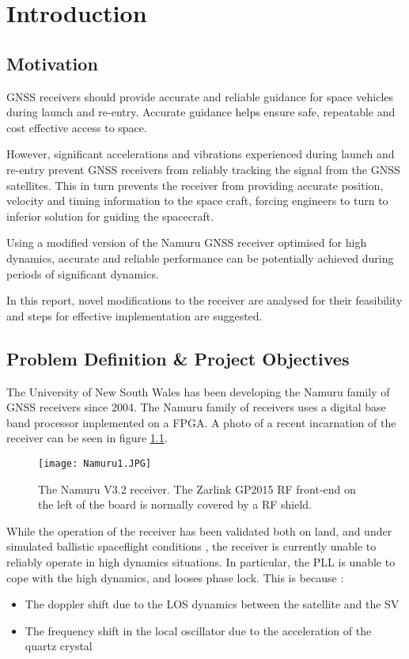 \chapter{Introduction}\label{ch:intro}

\section{Motivation}
\ac{GNSS} receivers should provide accurate and reliable guidance for space vehicles during launch and re-entry. Accurate guidance helps ensure safe, repeatable and cost effective access to space.

However, significant accelerations and vibrations experienced during launch and re-entry prevent \ac{GNSS} receivers from reliably tracking the signal from the \ac{GNSS} satellites. This in turn prevents the receiver from providing accurate position, velocity and timing information to the space craft, forcing engineers to turn to inferior solution for guiding the spacecraft.

Using a modified version of the Namuru \ac{GNSS} receiver optimised for high dynamics, accurate and reliable performance can be potentially achieved during periods of significant dynamics. 

In this report, novel modifications to the receiver are analysed for their feasibility and steps for effective implementation are suggested.

\section{Problem Definition \& Project Objectives}

The University of New South Wales has been developing the Namuru family of \ac{GNSS} receivers since 2004\cite{MumfordNamuru}. The Namuru family of receivers uses a digital base band processor implemented on a \ac{FPGA}\cite{Glennon11aquariusfirmware}. A photo of a recent incarnation of the receiver can be seen in figure \ref{fig:Namuru1}.

\begin{figure}[!htb] 
    \centering
    \texttt{[image: Namuru1.JPG]} 
    \caption{The Namuru V3.2 receiver. The Zarlink GP2015 \ac{RF} front-end on the left of the board is normally covered by a \ac{RF} shield.}
    \label{fig:Namuru1}
\end{figure}

While the operation of the receiver has been validated both on land, and under simulated ballistic spaceflight conditions \cite{NamuruSpaceflight1,NamuruSpaceflight2}, the receiver is currently unable to reliably operate in high dynamics situations. 
In particular, the \ac{PLL} is unable to cope with the high dynamics, and looses phase lock. This is because : 
\begin{itemize}
\item{The doppler shift due to the \ac{LOS} dynamics between the satellite and the \ac{SV}}
\item{The frequency shift in the local oscillator due to the acceleration of the quartz crystal}
\end{itemize}

